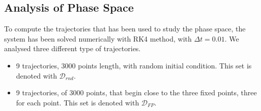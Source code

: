 \documentclass{article}
\begin{document}
\subsection{Analysis of Phase Space}
To compute the trajectories that has been used to study the phase space, the system has been solved numerically with RK4 method, with $\Delta t=0.01$. We analysed three different type of trajectories.
\begin{itemize}
    \item 9 trajectories, 3000 points length, with random initial condition. This set is denoted with $\mathcal{D}_{rnd}$.
    \item 9 trajectories, of 3000 points, that begin close to the three fixed points, three for each point. This set is denoted with $\mathcal{D}_{FP}$.
\end{itemize}
\end{document}
